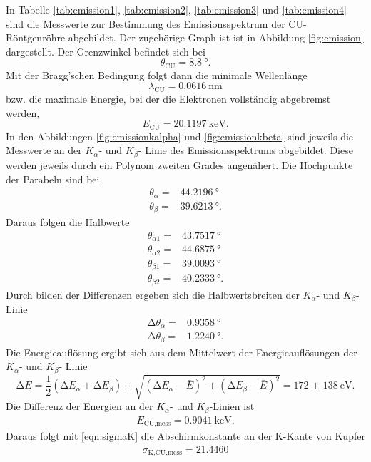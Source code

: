 In Tabelle \ref{tab:emission1}, \ref{tab:emission2}, \ref{tab:emission3} und
\ref{tab:emission4} sind die Messwerte zur Bestimmung des
Emissionsspektrum der CU-Röntgenröhre abgebildet. Der zugehörige Graph ist
ist in Abbildung \ref{fig:emission} dargestellt.
Der Grenzwinkel befindet sich bei
\begin{equation}
  \theta_\text{CU} = \SI{8.8}{\degree}.
\end{equation}
Mit der Bragg'schen Bedingung folgt dann die minimale Wellenlänge
\begin{equation}
  \lambda_\text{CU} = \SI{0.0616}{\nano\meter}
\end{equation}
bzw. die maximale Energie, bei der die Elektronen vollständig abgebremst werden,
\begin{equation}
  E_\text{CU} = \SI{20.1197}{\kilo\electronvolt}.
\end{equation}
In den Abbildungen \ref{fig:emissionkalpha} und \ref{fig:emissionkbeta} sind
jeweils die Messwerte an der $K_\alpha$- und $K_\beta$- Linie des
Emissionsspektrums abgebildet. Diese werden jeweils durch ein Polynom zweiten
Grades angenähert.
Die Hochpunkte der Parabeln sind bei
\begin{align}
  \theta_\alpha = & \SI{44.2196}{\degree} \\
  \theta_\beta = & \SI{39.6213}{\degree}.
\end{align}
Daraus folgen die Halbwerte
\begin{align}
  \theta_{\alpha 1} = & \SI{43.7517}{\degree} \\
  \theta_{\alpha 2} = & \SI{44.6875}{\degree} \\
  \theta_{\beta 1} = & \SI{39.0093}{\degree} \\
  \theta_{\beta 2} = & \SI{40.2333}{\degree}.
\end{align}
Durch bilden der Differenzen ergeben sich die Halbwertsbreiten der
$K_\alpha$- und $K_\beta$- Linie
\begin{align}
  \increment \theta_\alpha = & \SI{0.9358}{\degree} \\
  \increment \theta_\beta = & \SI{1.2240}{\degree}.
\end{align}
Die Energieauflösung ergibt sich aus dem Mittelwert der Energieauflösungen
der $K_\alpha$- und $K_\beta$- Linie
\begin{equation}
  \increment E = \frac{1}{2}(\increment E_\alpha + \increment E_\beta) \pm
  \sqrt{(\increment E_\alpha - \bar{E})^2 + (\increment E_\beta - \bar{E})^2}
  = \SI{172(138)}{\electronvolt}.
\end{equation}
Die Differenz der Energien an der $K_\alpha$- und $K_\beta$-Linien ist
\begin{align}
  E_\text{CU,mess} = \SI{0.9041}{\kilo\electronvolt}.
\end{align}
Daraus folgt mit \eqref{eqn:sigmaK}
die Abschirmkonstante an der K-Kante von Kupfer
\begin{align}
  \sigma_\text{K,CU,mess} = 21.4460
\end{align}

